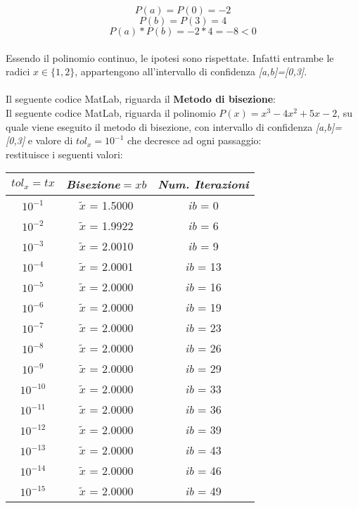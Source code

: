 	\[
	P(a) = P(0) = -2
	\]
	\[
	P(b) = P(3) = 4
	\]
	\[
	P(a)*P(b) = -2 * 4 = -8 < 0
	\]\\
Essendo il polinomio continuo, le ipotesi sono rispettate. Infatti entrambe le radici $x \in \{1,2\}$, appartengono all'intervallo di confidenza \textit{[a,b]=[0,3]}.\\\\
Il seguente codice MatLab, riguarda il \textbf{Metodo di bisezione}:\\
	
Il seguente codice MatLab, riguarda il polinomio $P(x) = x^3-4x^2+5x-2$, su quale viene eseguito il metodo di bisezione, con intervallo di confidenza \textit{[a,b]=[0,3]} e valore di $tol_x=10^{-1}$ che decresce ad ogni passaggio:\\
	
restituisce i seguenti valori:\\
\begin{center}
	\begin{tabular}{|c|c|c|}
		\hline
			$tol_x=tx$ & \textit{Bisezione}$=xb$ & \textit{Num. Iterazioni} \\
		\hline
   			$10^{-1}$ & $\tilde{x}$ = 1.5000 & \textit{ib} = 0\\
    		$10^{-2}$ & $\tilde{x}$ = 1.9922 & \textit{ib} = 6\\
    		$10^{-3}$ & $\tilde{x}$ = 2.0010 & \textit{ib} = 9\\
    		$10^{-4}$ & $\tilde{x}$ = 2.0001 & \textit{ib} = 13\\
   			$10^{-5}$ & $\tilde{x}$ = 2.0000 & \textit{ib} = 16\\
   			$10^{-6}$ & $\tilde{x}$ = 2.0000 & \textit{ib} = 19\\
    		$10^{-7}$ & $\tilde{x}$ = 2.0000 & \textit{ib} = 23\\
    		$10^{-8}$ & $\tilde{x}$ = 2.0000 & \textit{ib} = 26\\
    		$10^{-9}$ & $\tilde{x}$ = 2.0000 & \textit{ib} = 29\\
    		$10^{-10}$ & $\tilde{x}$ = 2.0000 & \textit{ib} = 33\\
    		$10^{-11}$ & $\tilde{x}$ = 2.0000 & \textit{ib} = 36\\
    		$10^{-12}$ & $\tilde{x}$ = 2.0000 & \textit{ib} = 39\\
    		$10^{-13}$ & $\tilde{x}$ = 2.0000 & \textit{ib} = 43\\
    		$10^{-14}$ & $\tilde{x}$ = 2.0000 & \textit{ib} = 46\\
    		$10^{-15}$ & $\tilde{x}$ = 2.0000 & \textit{ib} = 49\\
		\hline
	\end{tabular}
\end{center}
